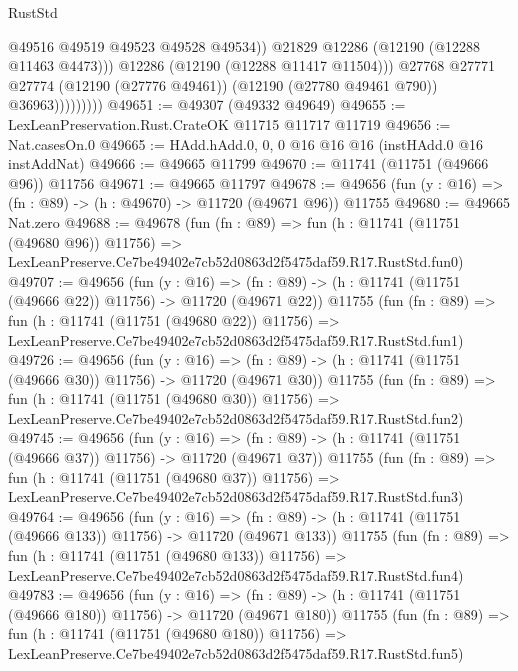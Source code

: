 \begin{lexlean}{RustStd}
\begin{coremodule}
                              @49516
                              @49519
                              @49523
                              @49528
                              @49534))
                          @21829
                          @12286
                          (@12190 (@12288 @11463 @4473)))
                        @12286
                        (@12190 (@12288 @11417 @11504)))
                      @27768
                      @27771
                      @27774
                      (@12190 (@27776 @49461))
                      (@12190 (@27780 @49461 @790))
                      @36963)))))))))
@49651 := @49307 (@49332 @49649)
@49655 := LexLeanPreservation.Rust.CrateOK @11715 @11717 @11719
@49656 := Nat.casesOn.{0}
@49665 := HAdd.hAdd.{0, 0, 0} @16 @16 @16 (instHAdd.{0} @16 instAddNat)
@49666 := @49665 @11799
@49670 := @11741 (@11751 (@49666 @96)) @11756
@49671 := @49665 @11797
@49678 := @49656 (fun (y : @16) => (fn : @89) -> (h : @49670) -> @11720 (@49671 @96)) @11755
@49680 := @49665 Nat.zero
@49688 := @49678
    (fun (fn : @89) =>
    fun (h : @11741 (@11751 (@49680 @96)) @11756) =>
    LexLeanPreserve.Ce7be49402e7cb52d0863d2f5475daf59.R17.RustStd.fun0)
@49707 := @49656
    (fun (y : @16) =>
    (fn : @89) -> (h : @11741 (@11751 (@49666 @22)) @11756) -> @11720 (@49671 @22))
    @11755
    (fun (fn : @89) =>
    fun (h : @11741 (@11751 (@49680 @22)) @11756) =>
    LexLeanPreserve.Ce7be49402e7cb52d0863d2f5475daf59.R17.RustStd.fun1)
@49726 := @49656
    (fun (y : @16) =>
    (fn : @89) -> (h : @11741 (@11751 (@49666 @30)) @11756) -> @11720 (@49671 @30))
    @11755
    (fun (fn : @89) =>
    fun (h : @11741 (@11751 (@49680 @30)) @11756) =>
    LexLeanPreserve.Ce7be49402e7cb52d0863d2f5475daf59.R17.RustStd.fun2)
@49745 := @49656
    (fun (y : @16) =>
    (fn : @89) -> (h : @11741 (@11751 (@49666 @37)) @11756) -> @11720 (@49671 @37))
    @11755
    (fun (fn : @89) =>
    fun (h : @11741 (@11751 (@49680 @37)) @11756) =>
    LexLeanPreserve.Ce7be49402e7cb52d0863d2f5475daf59.R17.RustStd.fun3)
@49764 := @49656
    (fun (y : @16) =>
    (fn : @89) -> (h : @11741 (@11751 (@49666 @133)) @11756) -> @11720 (@49671 @133))
    @11755
    (fun (fn : @89) =>
    fun (h : @11741 (@11751 (@49680 @133)) @11756) =>
    LexLeanPreserve.Ce7be49402e7cb52d0863d2f5475daf59.R17.RustStd.fun4)
@49783 := @49656
    (fun (y : @16) =>
    (fn : @89) -> (h : @11741 (@11751 (@49666 @180)) @11756) -> @11720 (@49671 @180))
    @11755
    (fun (fn : @89) =>
    fun (h : @11741 (@11751 (@49680 @180)) @11756) =>
    LexLeanPreserve.Ce7be49402e7cb52d0863d2f5475daf59.R17.RustStd.fun5)

\end{coremodule}
\end{lexlean}
